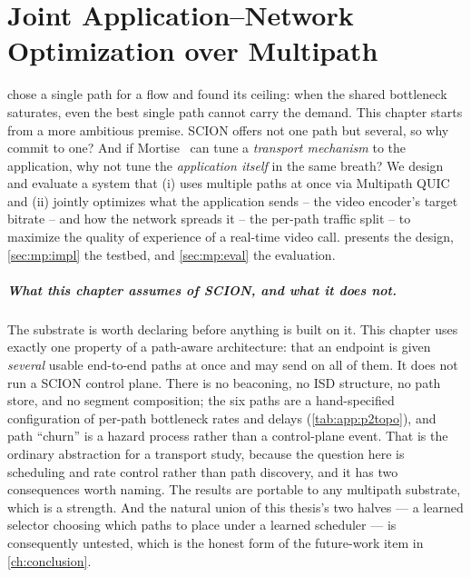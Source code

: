 \chapter{Joint Application--Network Optimization over Multipath}
\label{ch:multipath}

 chose a single path for a flow and found its ceiling: when the shared bottleneck
saturates, even the best single path cannot carry the demand. This chapter starts from a more ambitious
premise. SCION offers not one path but several, so why commit to one? And if Mortise~\cite{Shen2026} can
tune a \emph{transport mechanism} to the application, why not tune the \emph{application itself} in the
same breath? We design and evaluate a system that (i) uses multiple paths at once via Multipath
QUIC~\cite{DeConinck2017} and (ii) jointly optimizes what the application sends -- the video encoder's
target bitrate -- and how the network spreads it -- the per-path traffic split -- to maximize the quality
of experience of a real-time video call.  presents the design, \cref{sec:mp:impl} the
testbed, and \cref{sec:mp:eval} the evaluation.

\paragraph{What this chapter assumes of SCION, and what it does not.} The substrate is worth declaring
before anything is built on it. This chapter uses exactly one property of a path-aware architecture:
that an endpoint is given \emph{several} usable end-to-end paths at once and may send on all of them.
It does not run a SCION control plane. There is no beaconing, no ISD structure, no path store, and no
segment composition; the six paths are a hand-specified configuration of per-path bottleneck rates and
delays (\cref{tab:app:p2topo}), and path ``churn'' is a hazard process rather than a control-plane
event. That is the ordinary abstraction for a transport study, because the question here is scheduling
and rate control rather than path discovery, and it has two consequences worth naming. The results are
portable to any multipath substrate, which is a strength. And the natural union of this thesis's two
halves --- a learned selector choosing which paths to place under a learned scheduler --- is
consequently untested, which is the honest form of the future-work item in \cref{ch:conclusion}.

